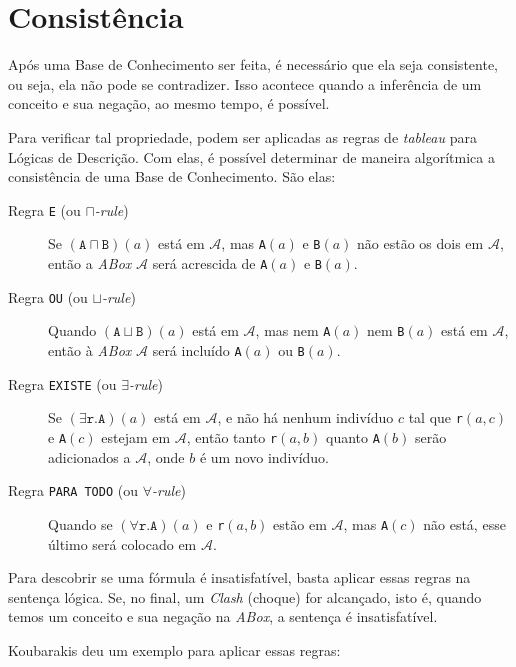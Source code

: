 \section{Consistência}

Após uma Base de Conhecimento ser feita, é necessário que ela seja consistente, ou seja, ela não pode se contradizer. Isso acontece quando a inferência de um conceito e sua negação, ao mesmo tempo, é possível. 

Para verificar tal propriedade, podem ser aplicadas as regras de \textit{tableau} para Lógicas de Descrição. Com elas, é possível determinar de maneira algorítmica a consistência de uma Base de Conhecimento. São elas:

\begin{description}
	\item[Regra \texttt{E} (ou \textit{$ \sqcap $-rule})] Se $(\texttt{A} \sqcap \texttt{B})(a)$ está em $ \mathcal{A} $, mas \texttt{A}$ (a) $ e \texttt{B}$ (a) $ não estão os dois em $ \mathcal{A} $, então a \textit{ABox} $ \mathcal{A} $ será acrescida de \texttt{A}$ (a) $ e \texttt{B}$ (a) $.
	\item[Regra \texttt{OU} (ou \textit{$ \sqcup $-rule})] Quando $(\texttt{A} \sqcup \texttt{B})(a)$ está em $ \mathcal{A} $, mas nem \texttt{A}$ (a) $ nem \texttt{B}$ (a) $ está em $ \mathcal{A} $, então à \textit{ABox} $ \mathcal{A} $ será incluído \texttt{A}$ (a) $ ou \texttt{B}$ (a) $.
	\item[Regra \texttt{EXISTE} (ou \textit{$ \exists $-rule})] Se $(\exists \texttt{r.A})(a)$ está em $ \mathcal{A} $, e não há nenhum indivíduo $ c $ tal que \texttt{r}$ (a,c) $ e \texttt{A}$ (c) $ estejam em $ \mathcal{A} $, então tanto \texttt{r}$ (a,b) $ quanto \texttt{A}$ (b) $ serão adicionados a $ \mathcal{A} $, onde $ b $ é um novo indivíduo.
	\item[Regra \texttt{PARA TODO} (ou \textit{$ \forall $-rule})] Quando se $(\forall \texttt{r.A})(a)$ e \texttt{r}$ (a,b) $ estão em $ \mathcal{A} $, mas \texttt{A}$ (c) $ não está, esse último será colocado em $ \mathcal{A} $.  
\end{description}

Para descobrir se uma fórmula é insatisfatível, basta aplicar essas regras na sentença lógica. Se, no final, um \textit{Clash} (choque) for alcançado, isto é, quando temos um conceito e sua negação na \textit{ABox}, a sentença é insatisfatível.

Koubarakis \cite{logicaKoubarakis} deu um exemplo para aplicar essas regras:

